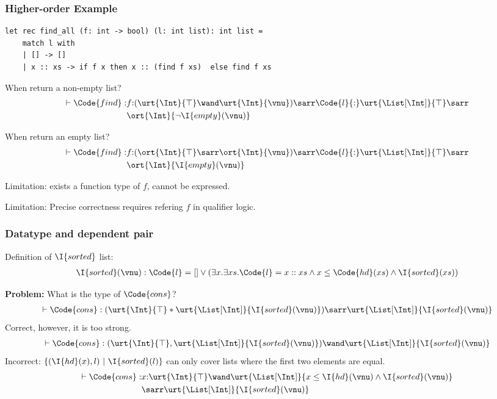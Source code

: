 \begin{frame}[fragile]
    \frametitle{Higher-order Example}

\begin{verbatim}
let rec find_all (f: int -> bool) (l: int list): int list =
    match l with
    | [] -> []
    | x :: xs -> if f x then x :: (find f xs)  else find f xs
\end{verbatim}

When return a non-empty list?
\begin{align*}
    \vdash \Code{find} : &f{:}(\urt{\Int}{\top} \wand \urt{\Int}{\vnu}) \sarr \Code{l}{:}\urt{\List[\Int]}{\top} \sarr 
    \\&\ort{\Int}{\neg \I{empty}(\vnu) }
\end{align*}\noindent

When return an empty list?
\begin{align*}
    \vdash \Code{find} : &f{:}(\ort{\Int}{\top} \sarr \ort{\Int}{\vnu}) \sarr \Code{l}{:}\urt{\List[\Int]}{\top} \sarr 
    \\&\ort{\Int}{\I{empty}(\vnu) }
\end{align*}\noindent

Limitation: exists a function type of $f$, cannot be expressed.

Limitation: Precise correctness requires refering $f$ in qualifier logic.

\end{frame}

\begin{frame}[fragile]
    \frametitle{Datatype and dependent pair}

Definition of $\I{sorted}$ list:
\begin{align*}
    \I{sorted}(\vnu) : \Code{l} = [] \lor (\exists x.\exists xs.\Code{l} = x::xs \land x \leq \Code{hd}(xs) \land \I{sorted}(xs))
\end{align*}\noindent

\textbf{Problem:} What is the type of $\Code{cons}$?
\begin{align*}
    \vdash \Code{cons} : (\urt{\Int}{\top} * \urt{\List[\Int]}{\I{sorted}(\vnu)}) \sarr \urt{\List[\Int]}{\I{sorted}(\vnu)}
\end{align*}\noindent
Correct, however, it is too strong.
\begin{align*}
    \vdash \Code{cons} : (\urt{\Int}{\top} , \urt{\List[\Int]}{\I{sorted}(\vnu)}) \wand \urt{\List[\Int]}{\I{sorted}(\vnu)}
\end{align*}\noindent
Incorrect: $\{(\I{hd}(x), l)~|~ \I{sorted}(l) \}$ can only cover lists where the first two elements are equal.
\begin{align*}
    \vdash \Code{cons} : &x{:}\urt{\Int}{\top} \wand \urt{\List[\Int]}{x\leq\I{hd}(\vnu) \land \I{sorted}(\vnu)} 
    \\&\sarr \urt{\List[\Int]}{\I{sorted}(\vnu)}
\end{align*}\noindent

\end{frame}

